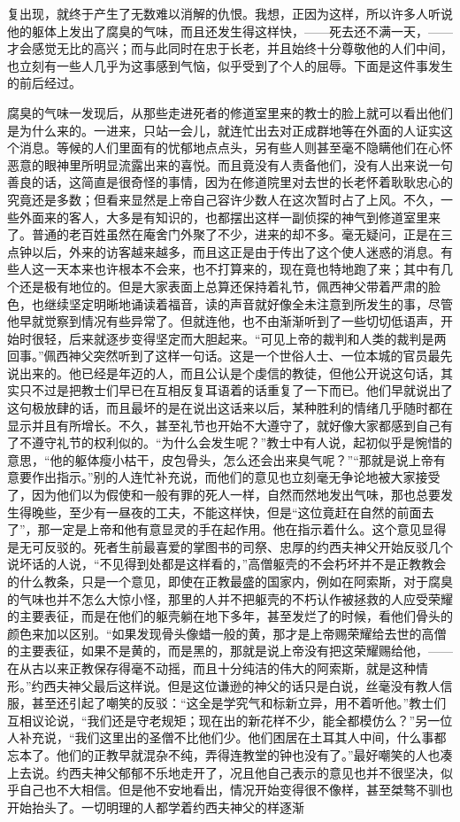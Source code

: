 复出现，就终于产生了无数难以消解的仇恨。我想，正因为这样，所以许多人听说他的躯体上发出了腐臭的气味，而且还发生得这样快，——死去还不满一天，——才会感觉无比的高兴；而与此同时在忠于长老，并且始终十分尊敬他的人们中间，也立刻有一些人几乎为这事感到气恼，似乎受到了个人的屈辱。下面是这件事发生的前后经过。
\par 腐臭的气味一发现后，从那些走进死者的修道室里来的教士的脸上就可以看出他们是为什么来的。一进来，只站一会儿，就连忙出去对正成群地等在外面的人证实这个消息。等候的人们里面有的忧郁地点点头，另有些人则甚至毫不隐瞒他们在心怀恶意的眼神里所明显流露出来的喜悦。而且竟没有人责备他们，没有人出来说一句善良的话，这简直是很奇怪的事情，因为在修道院里对去世的长老怀着耿耿忠心的究竟还是多数；但看来显然是上帝自己容许少数人在这次暂时占了上风。不久，一些外面来的客人，大多是有知识的，也都摆出这样一副侦探的神气到修道室里来了。普通的老百姓虽然在庵舍门外聚了不少，进来的却不多。毫无疑问，正是在三点钟以后，外来的访客越来越多，而且这正是由于传出了这个使人迷惑的消息。有些人这一天本来也许根本不会来，也不打算来的，现在竟也特地跑了来；其中有几个还是极有地位的。但是大家表面上总算还保持着礼节，佩西神父带着严肃的脸色，也继续坚定明晰地诵读着福音，读的声音就好像全未注意到所发生的事，尽管他早就觉察到情况有些异常了。但就连他，也不由渐渐听到了一些切切低语声，开始时很轻，后来就逐步变得坚定而大胆起来。“可见上帝的裁判和人类的裁判是两回事。”佩西神父突然听到了这样一句话。这是一个世俗人士、一位本城的官员最先说出来的。他已经是年迈的人，而且公认是个虔信的教徒，但他公开说这句话，其实只不过是把教士们早已在互相反复耳语着的话重复了一下而已。他们早就说出了这句极放肆的话，而且最坏的是在说出这话来以后，某种胜利的情绪几乎随时都在显示并且有所增长。不久，甚至礼节也开始不大遵守了，就好像大家都感到自己有了不遵守礼节的权利似的。“为什么会发生呢？”教士中有人说，起初似乎是惋惜的意思，“他的躯体瘦小枯干，皮包骨头，怎么还会出来臭气呢？”“那就是说上帝有意要作出指示。”别的人连忙补充说，而他们的意见也立刻毫无争论地被大家接受了，因为他们以为假使和一般有罪的死人一样，自然而然地发出气味，那也总要发生得晚些，至少有一昼夜的工夫，不能这样快，但是“这位竟赶在自然的前面去了”，那一定是上帝和他有意显灵的手在起作用。他在指示着什么。这个意见显得是无可反驳的。死者生前最喜爱的掌图书的司祭、忠厚的约西夫神父开始反驳几个说坏话的人说，“不见得到处都是这样看的，”高僧躯壳的不会朽坏并不是正教教会的什么教条，只是一个意见，即使在正教最盛的国家内，例如在阿索斯，对于腐臭的气味也并不怎么大惊小怪，那里的人并不把躯壳的不朽认作被拯救的人应受荣耀的主要表征，而是在他们的躯壳躺在地下多年，甚至发烂了的时候，看他们骨头的颜色来加以区别。“如果发现骨头像蜡一般的黄，那才是上帝赐荣耀给去世的高僧的主要表征，如果不是黄的，而是黑的，那就是说上帝没有把这荣耀赐给他，——在从古以来正教保存得毫不动摇，而且十分纯洁的伟大的阿索斯，就是这种情形。”约西夫神父最后这样说。但是这位谦逊的神父的话只是白说，丝毫没有教人信服，甚至还引起了嘲笑的反驳：“这全是学究气和标新立异，用不着听他。”教士们互相议论说，“我们还是守老规矩；现在出的新花样不少，能全都模仿么？”另一位人补充说，“我们这里出的圣僧不比他们少。他们困居在土耳其人中间，什么事都忘本了。他们的正教早就混杂不纯，弄得连教堂的钟也没有了。”最好嘲笑的人也凑上去说。约西夫神父郁郁不乐地走开了，况且他自己表示的意见也并不很坚决，似乎自己也不大相信。但是他不安地看出，情况开始变得很不像样，甚至桀骜不驯也开始抬头了。一切明理的人都学着约西夫神父的样逐渐